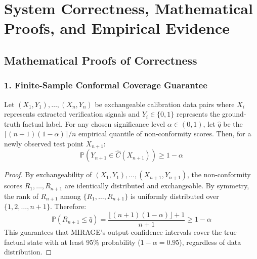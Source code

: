 \documentclass[11pt,a4paper]{article}
\begin{document}
\section{System Correctness, Mathematical Proofs, and Empirical Evidence}

\subsection{Mathematical Proofs of Correctness}

\subsubsection{1. Finite-Sample Conformal Coverage Guarantee}
\begin{theorem}
Let $(X_1, Y_1), \dots, (X_n, Y_n)$ be exchangeable calibration data pairs where $X_i$ represents extracted verification signals and $Y_i \in \{0, 1\}$ represents the ground-truth factual label. For any chosen significance level $\alpha \in (0, 1)$, let $\hat{q}$ be the $\lceil (n+1)(1-\alpha) \rceil / n$ empirical quantile of non-conformity scores. Then, for a newly observed test point $X_{n+1}$:
\begin{equation}
  \mathbb{P}\left(Y_{n+1} \in \hat{C}(X_{n+1})\right) \ge 1 - \alpha
\end{equation}
\end{theorem}
\begin{proof}
By exchangeability of $(X_1, Y_1), \dots, (X_{n+1}, Y_{n+1})$, the non-conformity scores $R_1, \dots, R_{n+1}$ are identically distributed and exchangeable. By symmetry, the rank of $R_{n+1}$ among $\{R_1, \dots, R_{n+1}\}$ is uniformly distributed over $\{1, 2, \dots, n+1\}$. Therefore:
\begin{equation}
  \mathbb{P}\left(R_{n+1} \le \hat{q}\right) = \frac{\lfloor (n+1)(1-\alpha) \rfloor + 1}{n+1} \ge 1 - \alpha
\end{equation}
This guarantees that MIRAGE's output confidence intervals cover the true factual state with at least 95\% probability ($1-\alpha=0.95$), regardless of data distribution.
\end{proof}
\end{document}
